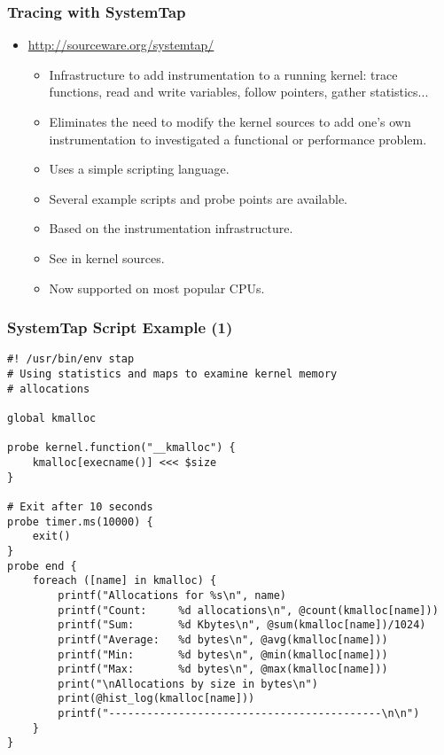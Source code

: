 \begin{frame}
  \frametitle{Tracing with SystemTap}
  \begin{itemize}
  \item \url{http://sourceware.org/systemtap/}
    \begin{itemize}
    \item Infrastructure to add instrumentation to a running kernel:
      trace functions, read and write variables, follow pointers,
      gather statistics...
    \item Eliminates the need to modify the kernel sources to add
      one's own instrumentation to investigated a functional or
      performance problem.
    \item Uses a simple scripting language.
    \item Several example scripts and probe points are available.
    \item Based on the  instrumentation infrastructure.
    \item See  in kernel sources.
    \item Now supported on most popular CPUs.
    \end{itemize}
  \end{itemize}
\end{frame}



\begin{frame}[fragile]
  \frametitle{SystemTap Script Example (1)}
{\tiny
\begin{verbatim}
#! /usr/bin/env stap
# Using statistics and maps to examine kernel memory
# allocations

global kmalloc

probe kernel.function("__kmalloc") {
    kmalloc[execname()] <<< $size
}

# Exit after 10 seconds
probe timer.ms(10000) {
    exit()
}
probe end {
    foreach ([name] in kmalloc) {
        printf("Allocations for %s\n", name)
        printf("Count:     %d allocations\n", @count(kmalloc[name]))
        printf("Sum:       %d Kbytes\n", @sum(kmalloc[name])/1024)
        printf("Average:   %d bytes\n", @avg(kmalloc[name]))
        printf("Min:       %d bytes\n", @min(kmalloc[name]))
        printf("Max:       %d bytes\n", @max(kmalloc[name]))
        print("\nAllocations by size in bytes\n")
        print(@hist_log(kmalloc[name]))
        printf("-------------------------------------------\n\n")
    }
}
\end{verbatim}
}
\end{frame}

